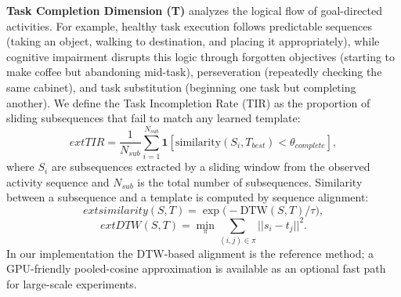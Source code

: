 \documentclass[sigconf, anonymous, 9pt, nonacm]{acmart}
\begin{document}
\noindent\textbf{Task Completion Dimension (T)} analyzes the logical flow of goal-directed activities. 
For example, healthy task execution follows predictable sequences (taking an object, walking to destination, and placing it appropriately), while cognitive impairment disrupts this logic through forgotten objectives (starting to make coffee but abandoning mid-task), perseveration (repeatedly checking the same cabinet), and task substitution (beginning one task but completing another). 
We define the Task Incompletion Rate (TIR) as the proportion of sliding subsequences that fail to match any learned template:
\begin{equation*}
	ext{TIR} = \frac{1}{N_{sub}}\sum_{i=1}^{N_{sub}} \mathbf{1}[\text{similarity}(S_i, T_{best}) < \theta_{complete}],
\end{equation*}
where $S_i$ are subsequences extracted by a sliding window from the observed activity sequence and $N_{sub}$ is the total number of subsequences. Similarity between a subsequence and a template is computed by sequence alignment:
\begin{equation*}
	ext{similarity}(S, T) = \exp\big(-\text{DTW}(S, T) / \tau\big),
\end{equation*}
\begin{equation*}
	ext{DTW}(S, T) = \min_{\pi} \sum_{(i,j) \in \pi} ||s_i - t_j||^2.
\end{equation*}
In our implementation the DTW-based alignment is the reference method; a GPU-friendly pooled-cosine approximation is available as an optional fast path for large-scale experiments.

\end{document}
